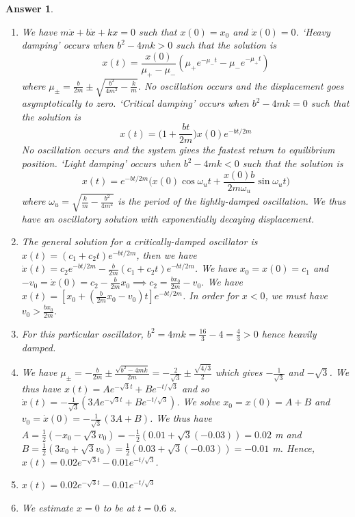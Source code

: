 \documentclass[a4paper]{article}
\newtheorem{ans}{Answer}[subsection]
\theoremstyle{new}
\begin{document}
\begin{ans}\leavevmode
\begin{enumerate}[label=(\roman*)]
\item We have $m\ddot{x}+b\dot{x}+kx=0$ such that $x(0)=x_0$ and $\dot{x}(0)=0$. `Heavy damping' occurs when $b^2-4mk>0$ such that the solution is
$$x(t)=\frac{x(0)}{\mu_+-\mu_-}(\mu_+e^{-\mu_-t}-\mu_-e^{-\mu_+t})$$
where $\mu_\pm=\frac{b}{2m}\pm\sqrt{\frac{b^2}{4m^2}-\frac{k}{m}}$. No oscillation occurs and the displacement goes asymptotically to zero. `Critical damping' occurs when $b^2-4mk=0$ such that the solution is
$$x(t)=\bigg(1+\frac{bt}{2m}\bigg)x(0)e^{-bt/2m}$$
No oscillation occurs and the system gives the fastest return to equilibrium position. `Light damping' occurs when $b^2-4mk<0$ such that the solution is
$$x(t)=e^{-bt/2m}\bigg(x(0)\cos\omega_ut+\frac{x(0)b}{2m\omega_u}\sin\omega_ut\bigg)$$
where $\omega_u=\sqrt{\frac{k}{m}-\frac{b^2}{4m^2}}$ is the period of the lightly-damped oscillation. We thus have an oscillatory solution with exponentially decaying displacement.
\item The general solution for a critically-damped oscillator is $x(t)=(c_1+c_2t)e^{-bt/2m}$, then we have $\dot{x}(t)=c_2e^{-bt/2m}-\frac{b}{2m}(c_1+c_2t)e^{-bt/2m}$. We have $x_0=x(0)=c_1$ and $-v_0=\dot{x}(0)=c_2-\frac{b}{2m}x_0\implies c_2=\frac{bx_0}{2m}-v_0$. We have $x(t)=[x_0+(\frac{b}{2m}x_0-v_0)t]e^{-bt/2m}$. In order for $x<0$, we must have $v_0>\frac{bx_0}{2m}$.
\item For this particular oscillator, $b^2=4mk=\frac{16}{3}-4=\frac{4}{3}>0$ hence heavily damped.
\item We have $\mu_\pm=-\frac{b}{2m}\pm\frac{\sqrt{b^2-4mk}}{2m}=-\frac{2}{\sqrt{3}}\pm\frac{\sqrt{4/3}}{2}$ which gives $-\frac{1}{\sqrt{3}}$ and $-\sqrt{3}$. We thus have $x(t)=Ae^{-\sqrt{3}t}+Be^{-t/\sqrt{3}}$ and so $\dot{x}(t)=-\frac{1}{\sqrt{3}}(3Ae^{-\sqrt{3}t}+Be^{-t/\sqrt{3}})$. We solve $x_0=x(0)=A+B$ and $v_0=\dot{x}(0)=-\frac{1}{\sqrt{3}}(3A+B)$. We thus have $A=\frac{1}{2}(-x_0-\sqrt{3}v_0)=-\frac{1}{2}(0.01+\sqrt{3}(-0.03))=0.02$ m and $B=\frac{1}{2}(3x_0+\sqrt{3}v_0)=\frac{1}{2}(0.03+\sqrt{3}(-0.03))=-0.01$ m. Hence, $x(t)=0.02e^{-\sqrt{3}t}-0.01e^{-t/\sqrt{3}}$.
\item  $x(t)=0.02e^{-\sqrt{3}t}-0.01e^{-t/\sqrt{3}}$
\begin{center}
\end{center}
\item We estimate $x=0$ to be at $t=0.6$ s.
\end{enumerate}
\end{ans}
\end{document}
